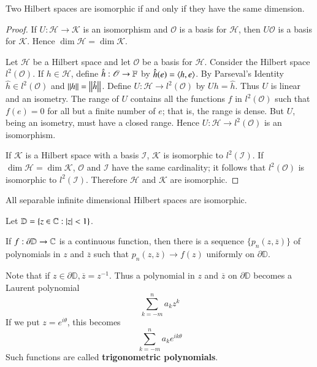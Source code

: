 \begin{thm}
    Two Hilbert spaces are isomorphic if and only if they have the same dimension.
\end{thm}
\begin{proof}
    If $U:\mathscr{H}\rightarrow \mathscr{K}$ is an isomorphism and $\mathscr{O}$ is a basis for $\mathscr{H}$, then $U\mathscr{O}$ is a basis for $\mathscr{K}$. Hence $\dim \mathscr{H} = \dim\mathscr{K}$.

    Let $\mathscr{H}$ be a Hilbert space and let $\mathscr{O}$ be a basis for $\mathscr{H}$. Consider the Hilbert space $l^2(\mathscr{O})$. If $h \in \mathscr{H}$, define $\hat{h}:\mathscr{O}\rightarrow \mathbb F$ by $\hat{h}(e) = \left\langle h, e\right\rangle$. By Parseval's Identity $\hat{h} \in l^2(\mathscr{O})$ and $\left|\left| h\right|\right| = \left|\left| \hat{h}\right|\right|$. Define $U:\mathscr{H}\rightarrow l^2(\mathscr{O})$ by $Uh = \hat{h}$. Thus $U$ is linear and an isometry. The range of $U$ contains all the functions $f$ in $l^2(\mathscr{O})$ such that $f(e) = 0$ for all but a finite number of $e$; that is, the range is dense. But $U$, being an isometry, must have a closed range. Hence $U:\mathscr{H}\rightarrow l^2(\mathscr{O})$ is an isomorphism.

    If $\mathscr{K}$ is a Hilbert space with a basis $\mathscr{I}$, $\mathscr{K}$ is isomorphic to $l^2(\mathscr{I})$. If $\dim \mathscr{H} = \dim \mathscr{K}$, $\mathscr{O}$ and $\mathscr{I}$ have the same cardinality; it follows that $l^2(\mathscr{O})$ is isomorphic to $l^2(\mathscr{I})$. Therefore $\mathscr{H}$ and $\mathscr{K}$ are isomorphic.
\end{proof}

\begin{cor}
    All separable infinite dimensional Hilbert spaces are isomorphic.
\end{cor}

Let $\mathbb{D} = \{z \in \mathbb C:|z| < 1\}$.

\begin{thm}
    If $f:\partial \mathbb{D}\rightarrow \mathbb C$ is a continuous function, then there is a sequence $\{p_n(z,\overline{z})\}$ of polynomials in $z$ and $\overline{z}$ such that $p_n(z,\overline{z})\rightarrow f(z)$ uniformly on $\partial \mathbb{D}$.
\end{thm}

Note that if $z \in \partial \mathbb{D}, \overline{z} = z^{-1}$. Thus a polynomial in $z$ and $\overline{z}$ on $\partial \mathbb{D}$ becomes a Laurent polynomial $$\sum_{k=-m}^na_kz^k$$
If we put $z = e^{i\theta}$, this becomes $$\sum_{k=-m}^na_ke^{ik\theta}$$
Such functions are called \textbf{trigonometric polynomials}.

